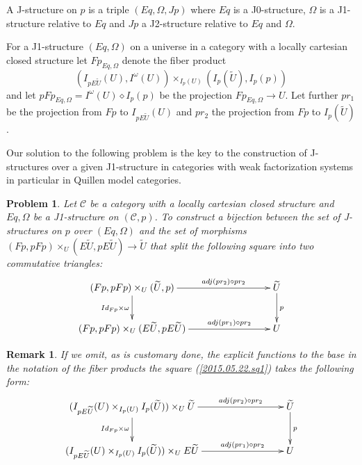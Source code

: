 \documentclass[12pt]{article}
\numberwithin{equation}{section}
\newenvironment{eq}{\begin{equation}}{\end{equation}}
\newtheorem{remark}[proposition]{Remark}
\newtheorem{problem}[proposition]{Problem}
\newcommand{\llabel}[1]{\label{#1}}
\newcommand{\sr}{\rightarrow}
\newcommand{\wt}{\widetilde}
\newcommand{\dd}{\diamond}
\begin{document}
A J-structure on $p$ is a triple $(Eq,\Omega,Jp)$ where $Eq$ is a J0-structure,
$\Omega$ is a J1-structure relative to $Eq$ and $Jp$ a J2-structure relative to
$Eq$ and $\Omega$.

For a J1-structure $(Eq,\Omega)$ on a universe in a category with a locally
cartesian closed structure let $Fp_{Eq,\Omega}$ denote the fiber product
%
$$(I_{pE\wt{U}}(U), I^{\omega}(U)) \times_{I_p(U)} (I_p(\wt{U}), I_p(p))$$
%
and let $pFp_{Eq,\Omega}=I^{\omega}(U)\dd I_p(p)$ be the projection
$Fp_{Eq,\Omega}\sr U$. Let further $pr_1$ be the projection from $Fp$ to
$I_{pE\wt{U}}(U)$ and $pr_2$ the projection from $Fp$ to $I_p(\wt{U})$.

Our solution to the following problem is the key to the construction of
J-structures over a given J1-structure in categories with weak factorization
systems in particular in Quillen model categories.
%
\begin{problem}
\llabel{2015.05.12.l1} Let $\mathcal C$ be a category with a locally cartesian
closed structure and $Eq,\Omega$ be a J1-structure on $({\mathcal C},p)$. To
construct a bijection between the set of J-structures on $p$ over $(Eq,\Omega)$
and the set of morphisms $(Fp,pFp)\times_U(E\wt{U},pE\wt{U})\sr \wt{U}$ that
split the following square into two commutative triangles:
%
\begin{eq}\llabel{2015.05.22.sq1}
\begin{xy}
          \xymatrix@C=7pc{ (Fp,pFp)\times_U(\wt{U},p) \ar[r]^-{adj(pr_2)\circ
              pr_2} \ar[d]_{Id_{Fp}\times \omega} & \wt{U}
            \ar[d]^{p}\\ (Fp,pFp)\times_U(E\wt{U},pE\wt{U})
            \ar[r]^-{adj(pr_1)\circ pr_2} & U }
\end{xy}
\end{eq}
%
\end{problem}
%
\begin{remark}\rm
If we omit, as is customary done, the explicit functions to the base in the
notation of the fiber products the square (\ref{2015.05.22.sq1}) takes the
following form:
%
\begin{eq}\llabel{2017.08.16.sq1}
\begin{xy}
          \xymatrix@C=7pc{ (I_{pE\wt{U}}(U)\times_{I_p(U)}
            I_p(\wt{U}))\times_U\wt{U} \ar[r]^-{adj(pr_2)\circ pr_2}
            \ar[d]_{Id_{Fp}\times \omega} & \wt{U}
            \ar[d]^{p}\\ (I_{pE\wt{U}}(U)\times_{I_p(U)} I_p(\wt{U}))\times_U
            E\wt{U} \ar[r]^-{adj(pr_1)\circ pr_2} & U }
\end{xy}
\end{eq}




\end{remark}
\end{document}
